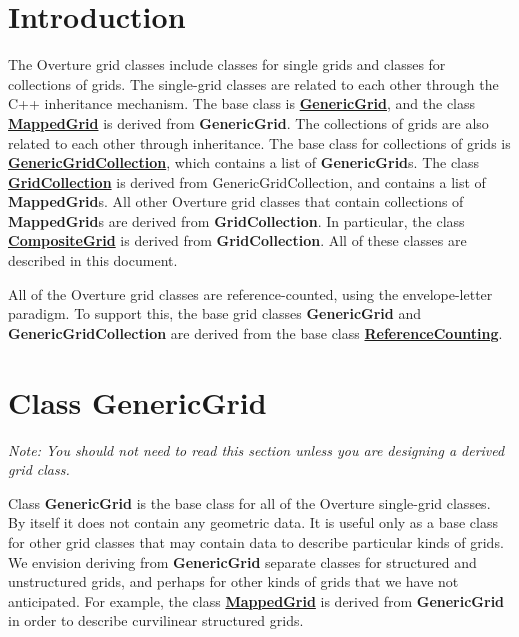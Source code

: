 \documentclass{article}
\begin{document}
\tableofcontents
\vfill\eject


\section{Introduction}
\label{Introduction}

The Overture grid classes include classes for single grids and classes
for collections of grids.  The single-grid classes are related to each
other through the C++ inheritance mechanism.  The base class is
{\bf{}\hyperref{GenericGrid}{GenericGrid \rm(\S}{)}{GenericGrid}},
and the class
{\bf{}\hyperref{MappedGrid}{MappedGrid \rm(\S}{)}{MappedGrid}}
is derived from \textbf{GenericGrid}.
The collections of grids are also related to each other through
inheritance.  The base class for collections of grids is
{\bf{}\hyperref{GenericGridCollection}{GenericGridCollection \rm(\S}{)}{GenericGridCollection}},
which contains a list of \textbf{GenericGrid}s.  The class
{\bf{}\hyperref{GridCollection}{GridCollection \rm(\S}{)}{GridCollection}}
is derived from GenericGridCollection, and contains a list of
\textbf{MappedGrid}s.  All other Overture grid classes that
contain collections of \textbf{MappedGrid}s are derived from
\textbf{GridCollection}.  In particular, the class
{\bf{}\hyperref{CompositeGrid}{CompositeGrid \rm(\S}{)}{CompositeGrid}}
is derived from \textbf{GridCollection}.
All of these classes are described in this document.

All of the Overture grid classes are reference-counted, using the envelope-letter
paradigm.  To support this, the base grid classes \textbf{GenericGrid} and
\textbf{GenericGridCollection} are derived from the base class
{\bf{}\hyperref{ReferenceCounting}{ReferenceCounting \rm(Appendix }{)}{ReferenceCounting}}.

\section{Class GenericGrid}
\label{GenericGrid}

{\em Note:  You should not need to read this section unless you are designing a derived grid class.}

Class \textbf{GenericGrid} is the base class for all of the Overture
single-grid classes.  By itself it does not contain any geometric data.
It is useful only as a base class for other grid classes that may
contain data to describe particular kinds of grids.  We envision deriving
from \textbf{GenericGrid} separate classes for structured and unstructured
grids, and perhaps for other kinds of grids that we have not anticipated.
For example, the class
{\bf{}\hyperref{MappedGrid}{MappedGrid \rm(\S}{)}{MappedGrid}}
is derived from \textbf{GenericGrid} in order to describe curvilinear
structured grids.
\end{document}
